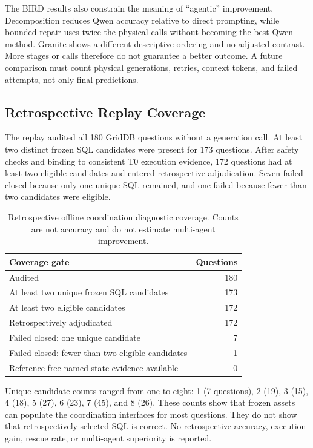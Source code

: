 \documentclass[applsci,article,submit,moreauthors]{Definitions/mdpi}
\begin{document}
The BIRD results also constrain the meaning of ``agentic'' improvement. Decomposition reduces Qwen accuracy relative to direct prompting, while bounded repair uses twice the physical calls without becoming the best Qwen method. Granite shows a different descriptive ordering and no adjusted contrast. More stages or calls therefore do not guarantee a better outcome. A future comparison must count physical generations, retries, context tokens, and failed attempts, not only final predictions.

\subsection{Retrospective Replay Coverage}

The replay audited all 180 GridDB questions without a generation call. At least two distinct frozen SQL candidates were present for 173 questions. After safety checks and binding to consistent T0 execution evidence, 172 questions had at least two eligible candidates and entered retrospective adjudication. Seven failed closed because only one unique SQL remained, and one failed because fewer than two candidates were eligible.

\begin{table}[htbp]
\caption{Retrospective offline coordination diagnostic coverage. Counts are not accuracy and do not estimate multi-agent improvement.}
\label{tab:replay}
\centering
\begin{tabular}{lr}
\toprule
Coverage gate & Questions\\
\midrule
Audited & 180\\
At least two unique frozen SQL candidates & 173\\
At least two eligible candidates & 172\\
Retrospectively adjudicated & 172\\
Failed closed: one unique candidate & 7\\
Failed closed: fewer than two eligible candidates & 1\\
Reference-free named-state evidence available & 0\\
\bottomrule
\end{tabular}
\end{table}

Unique candidate counts ranged from one to eight: 1 (7 questions), 2 (19), 3 (15), 4 (18), 5 (27), 6 (23), 7 (45), and 8 (26). These counts show that frozen assets can populate the coordination interfaces for most questions. They do not show that retrospectively selected SQL is correct. No retrospective accuracy, execution gain, rescue rate, or multi-agent superiority is reported.
\end{document}
